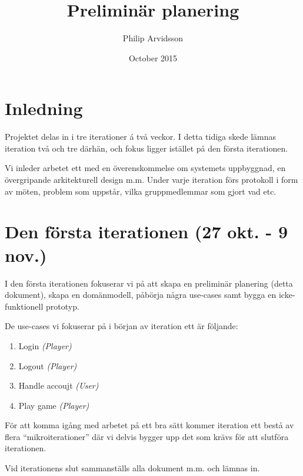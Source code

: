 \documentclass[a4paper]{article}
\title{Preliminär planering}
\author{Philip Arvidsson}
\date{October 2015}
\begin{document}
    \maketitle

    \section{Inledning}
    Projektet delas in i tre iterationer á två veckor. I detta tidiga skede
    lämnas iteration två och tre därhän, och fokus ligger istället på den
    första iterationen.

    Vi inleder arbetet ett med en överenskommelse om systemets uppbyggnad,
    en övergripande arkitekturell design m.m. Under varje iteration förs
    protokoll i form av möten, problem som uppstår, vilka gruppmedlemmar som
    gjort vad etc.

    \section{Den första iterationen (27 okt. - 9 nov.)}

    I den första iterationen fokuserar vi på att skapa en preliminär planering
    (detta dokument), skapa en domänmodell, påbörja några use-cases samt bygga
    en icke-funktionell prototyp.

    De use-cases vi fokuserar på i början av iteration ett är följande:

    \begin{enumerate}
        \item Login \textit{(Player)}
        \item Logout \textit{(Player)}
        \item Handle accoujt \textit{(User)}
        \item Play game \textit{(Player)}
    \end{enumerate}

    För att komma igång med arbetet på ett bra sätt kommer iteration ett bestå
    av flera ``mikroiterationer'' där vi delvis bygger upp det som krävs för att
    slutföra iterationen.

    Vid iterationens slut sammanställs alla dokument m.m. och lämnas in.
\end{document}
